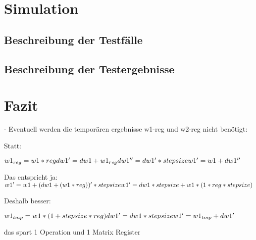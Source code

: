 \documentclass
[ 12pt,
  parskip=half %
]{scrreprt}
\begin{document}




\chapter{Simulation}

\section{Beschreibung der Testfälle}

\section{Beschreibung der Testergebnisse}

\chapter{Fazit}

- Eventuell werden die temporären ergebnisse w1-reg und w2-reg nicht benötigt:

Statt:

\(
w1_{reg} = w1 * reg \\
dw1' = dw1 + w1_{reg} \\
dw1'' = dw1' * stepsize \\
w1' = w1 + dw1'' \\
\)

Das entspricht ja:
\(
w1' = w1 + (dw1 + (w1 * reg))' * stepsize \\
w1' = dw1 * stepsize + w1 * (1 *reg * stepsize)
\)


Deshalb besser:

\(
w1_{tmp} = w1 * (1+stepsize*reg) \\
dw1' = dw1 * stepsize \\
w1' = w1_{tmp} + dw1' \\
\)


das spart 1 Operation und 1 Matrix Register
\end{document}
